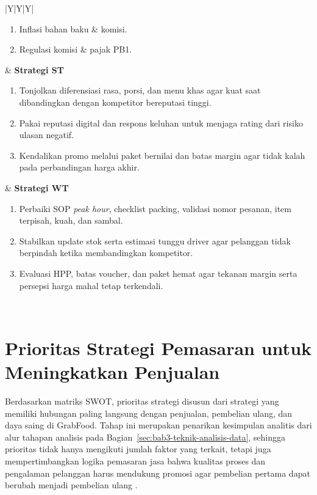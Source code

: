 \begin{xltabular}{\textwidth}{|Y|Y|Y|}
\begin{enumerate}[label=\textbf{T\arabic*.},leftmargin=1.5em,nosep,itemsep=0pt,topsep=1pt,parsep=0pt,partopsep=0pt]
            \item Inflasi bahan baku \& komisi.
            \item Regulasi komisi \& pajak PB1.
        \end{enumerate} & \textbf{Strategi ST}
        \begin{enumerate}[label=\textbf{ST\arabic*.},leftmargin=1.7em,nosep,itemsep=0pt,topsep=1pt,parsep=0pt,partopsep=0pt]
            \item Tonjolkan diferensiasi rasa, porsi, dan menu khas agar kuat saat dibandingkan dengan kompetitor bereputasi tinggi.
            \item Pakai reputasi digital dan respons keluhan untuk menjaga rating dari risiko ulasan negatif.
            \item Kendalikan promo melalui paket bernilai dan batas margin agar tidak kalah pada perbandingan harga akhir.
        \end{enumerate} & \textbf{Strategi WT}
        \begin{enumerate}[label=\textbf{WT\arabic*.},leftmargin=1.7em,nosep,itemsep=0pt,topsep=1pt,parsep=0pt,partopsep=0pt]
            \item Perbaiki SOP \textit{peak hour}, checklist packing, validasi nomor pesanan, item terpisah, kuah, dan sambal.
            \item Stabilkan update stok serta estimasi tunggu driver agar pelanggan tidak berpindah ketika membandingkan kompetitor.
            \item Evaluasi HPP, batas voucher, dan paket hemat agar tekanan margin serta persepsi harga mahal tetap terkendali.
        \end{enumerate} \\ \hline
    \end{xltabular}
\endgroup
\clearpage

\section{Prioritas Strategi Pemasaran untuk Meningkatkan Penjualan}
Berdasarkan matriks SWOT, prioritas strategi disusun dari strategi yang memiliki hubungan paling langsung dengan penjualan, pembelian ulang, dan daya saing di GrabFood. Tahap ini merupakan penarikan kesimpulan analitis dari alur tahapan analisis pada Bagian~\ref{sec:bab3-teknik-analisis-data}, sehingga prioritas tidak hanya mengikuti jumlah faktor yang terkait, tetapi juga mempertimbangkan logika pemasaran jasa bahwa kualitas proses dan pengalaman pelanggan harus mendukung promosi agar pembelian pertama dapat berubah menjadi pembelian ulang \parencite{wirtz2024servicesmarketing,kotler2023principlesmarketing}.

